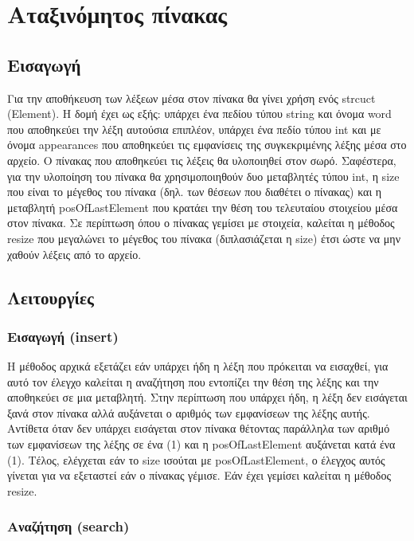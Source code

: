 \chapter{Αταξινόμητος πίνακας}

\section{Εισαγωγή}

Για την αποθήκευση των λέξεων μέσα στον πίνακα θα γίνει χρήση ενός strcuct (Element). Η δομή έχει ως εξής: υπάρχει ένα πεδίου τύπου string και όνομα word που αποθηκεύει την λέξη αυτούσια επιπλέον, υπάρχει ένα πεδίο τύπου int και με όνομα appearances που αποθηκεύει τις εμφανίσεις της συγκεκριμένης λέξης μέσα στο αρχείο. Ο πίνακας που αποθηκεύει τις λέξεις θα υλοποιηθεί στον σωρό. Σαφέστερα, για την υλοποίηση του πίνακα θα χρησιμοποιηθούν δυο μεταβλητές τύπου int, η size που είναι το μέγεθος του πίνακα (δηλ. των θέσεων που διαθέτει ο πίνακας) και η μεταβλητή posOfLastElement που κρατάει την θέση του τελευταίου στοιχείου μέσα στον πίνακα.  Σε περίπτωση όπου ο πίνακας γεμίσει με στοιχεία, καλείται η μέθοδος resize που μεγαλώνει το μέγεθος του πίνακα (διπλασιάζεται η size)  έτσι ώστε να μην χαθούν λέξεις από το αρχείο.

\section{Λειτουργίες}

\subsection{Εισαγωγή (insert)}

Η μέθοδος αρχικά εξετάζει εάν υπάρχει ήδη η λέξη που πρόκειται να εισαχθεί, για αυτό τον έλεγχο καλείται η αναζήτηση που εντοπίζει την θέση της λέξης και την αποθηκεύει σε μια μεταβλητή. Στην περίπτωση που υπάρχει ήδη, η λέξη δεν εισάγεται ξανά στον πίνακα αλλά αυξάνεται ο αριθμός των εμφανίσεων της λέξης αυτής. Αντίθετα όταν δεν υπάρχει εισάγεται στον πίνακα θέτοντας παράλληλα των αριθμό των εμφανίσεων της λέξης σε ένα (1) και η posOfLastElement αυξάνεται κατά ένα (1). Τέλος, ελέγχεται εάν το size ισούται με posOfLastElement, ο έλεγχος αυτός γίνεται για να εξεταστεί εάν ο πίνακας γέμισε. Εάν έχει γεμίσει καλείται η  μέθοδος resize.

\subsection{Αναζήτηση (search)}

